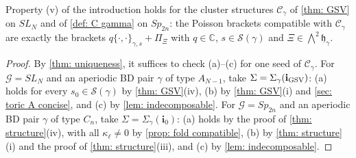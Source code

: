 \documentclass[a4paper]{amsart}
\numberwithin{equation}{section}
\theoremstyle{definition}
\theoremstyle{remark}
\newcommand{\bbC}{\mathbb{C}}
\newcommand{\mfh}{\mathfrak{h}}
\newcommand{\mcG}{\mathcal{G}}
\newcommand{\mcC}{\mathcal{C}}
\newcommand{\mcS}{\mathcal{S}}
\newcommand{\bfi}{\mathbf{i}}
\newcommand{\toric}{\Pi}
\newcommand{\Sp}{Sp_{2n}}
\begin{document}
\begin{corollary}
  \label{cor: uniqueness}
  Property (v) of the introduction holds for the cluster structures $\mcC_\gamma$ of \cref{thm: GSV} on $SL_N$ and of \cref{def: C gamma} on $\Sp$: the Poisson brackets compatible with $\mcC_\gamma$ are exactly the brackets $q\{\cdot,\cdot\}_{\gamma,s}+\toric_\Xi$ with $q\in\bbC$, $s\in\mcS(\gamma)$ and $\Xi\in\bigwedge^2\mfh_\gamma$.
\end{corollary}
\begin{proof}
  By \cref{thm: uniqueness}, it suffices to check (a)--(c) for one seed of $\mcC_\gamma$.
  For $\mcG=SL_N$ and an aperiodic BD pair $\gamma$ of type $A_{N-1}$, take $\Sigma=\Sigma_\gamma(\bfi_{\rm GSV})$: (a) holds for every $s_0\in\mcS(\gamma)$ by \cref{thm: GSV}(iv), (b) by \cref{thm: GSV}(i) and \cref{sec: toric A concise}, and (c) by \cref{lem: indecomposable}.
  For $\mcG=\Sp$ and an aperiodic BD pair $\gamma$ of type $C_n$, take $\Sigma=\Sigma_\gamma(\bfi_0)$: (a) holds by the proof of \cref{thm: structure}(iv), with all $\kappa_\ell\neq0$ by \cref{prop: fold compatible}, (b) by \cref{thm: structure}(i) and the proof of \cref{thm: structure}(iii), and (c) by \cref{lem: indecomposable}.
\end{proof}
\end{document}
